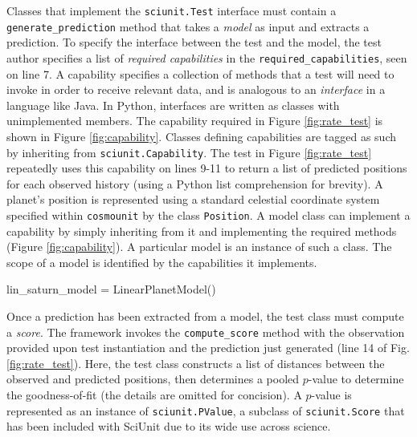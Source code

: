 \documentclass[9pt]{sig-alternate}
\newcommand{\verbx}[1]{\lstinline{#1}}
\begin{document}
Classes that implement the \verbx{sciunit.Test} interface must contain a \verbx{generate_prediction} method that takes a \emph{model} as input and extracts a prediction. To specify the interface between the test and the model, the test author specifies a list of \emph{required capabilities} in the \verbx{required_capabilities}, seen on line 7. 
A capability specifies a collection of methods that a test will need to invoke in order to receive relevant data, and is analogous to an \emph{interface} in a language like Java. 
In Python, interfaces are written as classes with unimplemented members. 
The capability required in Figure \ref{fig:rate_test} is shown in Figure \ref{fig:capability}. 
Classes defining capabilities are tagged as such by inheriting from \verbx{sciunit.Capability}. The test in Figure \ref{fig:rate_test} repeatedly uses this capability on lines 9-11 to return a list of predicted positions for each observed history (using a Python list comprehension for brevity).  A planet's position is represented using a standard celestial coordinate system specified within \verbx{cosmounit} by the class \verbx{Position}. A model class can implement a capability by simply inheriting from it and implementing the required methods (Figure \ref{fig:capability}). A particular model is an instance of such a class.  The scope of a model is identified by the capabilities it implements.
\vspace{-3px}
\begin{python}
lin_saturn_model = LinearPlanetModel()
\end{python}
\vspace{-5px}
Once a prediction has been extracted from a model, the test class must compute a \emph{score}. The framework invokes the \verbx{compute_score} method with the observation provided upon test instantiation and the prediction just generated (line 14 of Fig. \ref{fig:rate_test}). Here, the test class constructs a list of distances between the observed and predicted positions, then determines a pooled $p$-value to determine the goodness-of-fit (the details are omitted for concision). A $p$-value is represented as an instance of \verbx{sciunit.PValue}, a subclass of \texttt{sciunit.Score} that has been included with {SciUnit} due to its wide use across science. %
\end{document}
